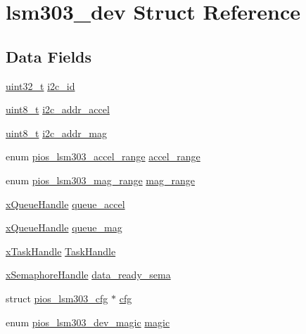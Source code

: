 \hypertarget{structlsm303__dev}{\section{lsm303\-\_\-dev Struct Reference}
\label{structlsm303__dev}
}
\subsection*{Data Fields}
\begin{DoxyCompactItemize}
\item 
\hyperlink{stdint_8h_a435d1572bf3f880d55459d9805097f62}{uint32\-\_\-t} \hyperlink{structlsm303__dev_a30d3092e0b3541399e2901bf71a0e6c2}{i2c\-\_\-id}
\item 
\hyperlink{stdint_8h_aba7bc1797add20fe3efdf37ced1182c5}{uint8\-\_\-t} \hyperlink{structlsm303__dev_a43a431687ad3d1280504751dd67b99ad}{i2c\-\_\-addr\-\_\-accel}
\item 
\hyperlink{stdint_8h_aba7bc1797add20fe3efdf37ced1182c5}{uint8\-\_\-t} \hyperlink{structlsm303__dev_a43b3cb1f2405df34e8542d968e9eb321}{i2c\-\_\-addr\-\_\-mag}
\item 
enum \hyperlink{group___p_i_o_s___l_s_m303_gafbb0e59427f40a8d9b0e901af02bb7b3}{pios\-\_\-lsm303\-\_\-accel\-\_\-range} \hyperlink{structlsm303__dev_a925acad41a5880d09927a1d63130e055}{accel\-\_\-range}
\item 
enum \hyperlink{group___p_i_o_s___l_s_m303_ga24737af5b503329ca628b921e32ec8d8}{pios\-\_\-lsm303\-\_\-mag\-\_\-range} \hyperlink{structlsm303__dev_a9c4089c3f5674a6fc5d51d06d90501cc}{mag\-\_\-range}
\item 
\hyperlink{_common_2_libraries_2_free_r_t_o_s_2_source_2include_2queue_8h_a229037f755b756156e34a440ce134b8b}{x\-Queue\-Handle} \hyperlink{structlsm303__dev_aadc09417d06ef07b4f4eb39b74f947a0}{queue\-\_\-accel}
\item 
\hyperlink{_common_2_libraries_2_free_r_t_o_s_2_source_2include_2queue_8h_a229037f755b756156e34a440ce134b8b}{x\-Queue\-Handle} \hyperlink{structlsm303__dev_a4801df95b04cdb58185c818dca8ae4ef}{queue\-\_\-mag}
\item 
\hyperlink{_common_2_libraries_2_free_r_t_o_s_2_source_2include_2task_8h_a271ae40d5db07d928a113766505a0965}{x\-Task\-Handle} \hyperlink{structlsm303__dev_aa53f45353583c54556c8fd920144726a}{Task\-Handle}
\item 
\hyperlink{_common_2_libraries_2_free_r_t_o_s_2_source_2include_2semphr_8h_aa91aa1b6835a184838f9ccf138a6ad10}{x\-Semaphore\-Handle} \hyperlink{structlsm303__dev_ab14a7b6518eb1699835c6d284425a6bb}{data\-\_\-ready\-\_\-sema}
\item 
struct \hyperlink{structpios__lsm303__cfg}{pios\-\_\-lsm303\-\_\-cfg} $\ast$ \hyperlink{structlsm303__dev_ad5dc8f3a8d9729f36b59e641a907c232}{cfg}
\item 
enum \hyperlink{group___p_i_o_s___l_s_m303_ga541e751cf6c930fc56ab31e10b857a74}{pios\-\_\-lsm303\-\_\-dev\-\_\-magic} \hyperlink{structlsm303__dev_a70f59374a7f9e9a6297167795f5b8bdf}{magic}
\end{DoxyCompactItemize}


